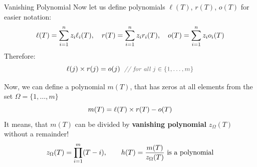 \documentclass{zkdl-presentation-template}
\begin{document}
    \begin{frame}{Vanishing Polynomial}
        Now let us define polynomials $\ell(T)$, $r(T)$, $o(T)$ for easier notation:
        \vspace{-5pt}
        \begin{equation*}
            \ell(T) = \sum_{i = 1}^{n} z_i\ell_i(T), \quad r(T) = \sum_{i = 1}^{n} z_ir_i(T), \quad o(T) = \sum_{i = 1}^{n} z_io_i(T)
            \vspace{-5pt}
        \end{equation*}
        \pause
        Therefore:
        \vspace{-5pt}
        \begin{equation*}
            \ell(j) \times r(j) = o(j) \; \commentgray{for all $j \in \{1,\dots,m\}$}
            \vspace{-5pt}
        \end{equation*}

        Now, we can define a polynomial $m(T)$, that has zeros at all elements from the set
        $\Omega = \{1,\dots,m\}$
        \vspace{-5pt}
        \begin{equation*}
            m(T) = \ell(T) \times r(T) - o(T)
            \vspace{-5pt}
        \end{equation*}
        \pause
        It means, that $m(T)$ can be divided by \textbf{vanishing polynomial} $z_{\Omega}(T)$ without a remainder!
        \vspace{-8pt}
        \begin{equation*}
            z_{\Omega}(T) = \prod_{i=1}^m (T - i), \qquad \text{$h(T) = \frac{m(T)}{z_{\Omega}(T)}$ is a polynomial}
            \vspace{-5pt}
        \end{equation*}
    \end{frame}
\end{document}
